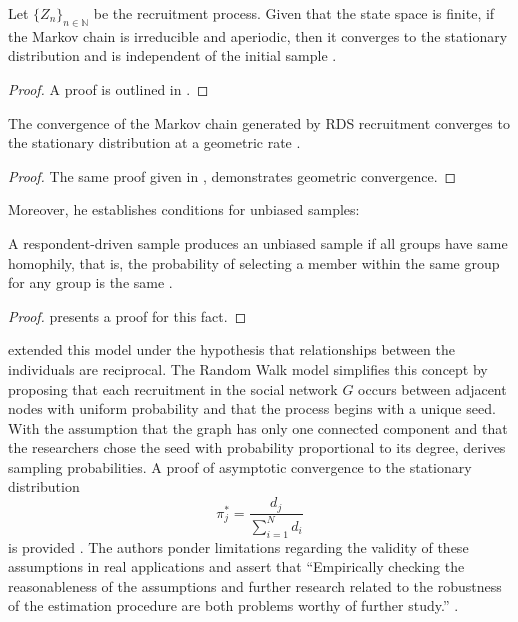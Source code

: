 \begin{theorem} 
    Let $\{Z_n\}_{n \in \mathbb{N}}$ be the recruitment process. Given that
    the state space is finite, if the Markov chain is irreducible and
    aperiodic, then it converges to the stationary distribution and is
    independent of the initial sample \cite[p. 183]{heckathorn1997}. 
\end{theorem}

\begin{proof}
   A proof is outlined in \cite[p. 52-53]{levin2017markov}. 
\end{proof}

\begin{theorem}
    The convergence of the Markov chain generated by RDS recruitment converges
    to the stationary distribution at a geometric rate \cite[p. 186]{heckathorn1997}.
\end{theorem}

\begin{proof}
    The same proof given in \cite[p. 52-53]{levin2017markov}, demonstrates
    geometric convergence.
\end{proof}

Moreover, he establishes conditions for unbiased samples:

\begin{theorem}
  A respondent-driven sample produces an unbiased sample if all groups have
  same homophily, that is, the probability of selecting a member within the
  same group for any group is the same \cite[p. 192]{heckathorn1997}.
\end{theorem}

\begin{proof}
  \textcite[p. 191 - 192]{heckathorn1997} presents a proof for this fact. 
\end{proof}

\textcite[p.22]{heckathorn2002} extended this model under the hypothesis that relationships between
the individuals are reciprocal. The Random Walk model simplifies this concept
by proposing that each recruitment in the social network $G$ occurs between
adjacent nodes with uniform probability and that the process begins with a
unique seed. With the assumption that the graph has only one connected
component and that the researchers chose the seed with probability
proportional to its degree, \textcite[p. 209-218]{salganik2004sampling}
derives sampling probabilities. A proof of asymptotic convergence to the stationary
distribution 
\begin{equation}
  \pi_j^{*} = \frac{d_j}{\sum_{i=1}^N d_i}
\end{equation}
is provided \cite[p. 234-235]{salganik2004sampling}. The authors ponder
limitations regarding the validity of these assumptions in real applications
and assert that ``Empirically checking the reasonableness of the assumptions and further 
research related to the robustness of the estimation procedure are
both problems worthy of further study.'' \cite[p. 230]{salganik2004sampling}.

